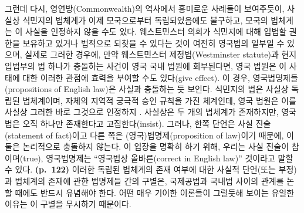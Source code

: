 그런데 다시, 영연방(Commonwealth)의 역사에서 흥미로운 사례들이
보여주듯이, 사실상 식민지의 법체계가 이제 모국으로부터 독립되었음에도
불구하고, 모국의 법체계는 이 사실을 인정하지 않을 수도 있다.
웨스트민스터 의회가 식민지에 대해 입법할 권한을 보유하고 있거나 법적으로
되찾을 수 있다는 것이 여전히 영국법의 일부일 수 있으며, 실제로 그러한
경우에, 만약 웨스트민스터 제정법(Westminster statute)과 현지 입법부의 법
하나가 충돌하는 사건이 영국 국내 법원에 회부된다면, 영국 법원은 이
사태에 대한 이러한 관점에 효력을 부여할 수도 있다(give effect). 이 경우,
영국법명제들(propositions of English law)은 사실과 충돌하는 듯 보인다.
식민지의 법은 사실상 독립된 법체계이며, 자체의 지역적 궁극적 승인 규칙을
가진 체계인데, 영국 법원은 이를 사실상 그러한 바로 그것으로 인정하지
. 사실상은 두 개의 법체계가 존재하지만, 영국법은 오직
하나만 존재한다고 고집한다(insist). 그러나, 한쪽 단언은 사실
진술(statement of fact)이고 다른 쪽은 (영국)법명제(proposition of
law)이기 때문에, 이 둘은 논리적으로 충돌하지 않는다. 이 입장을 명확히
하기 위해, 우리는 사실 진술이 참이며(true), 영국법명제는 “영국법상
올바른(correct in English law)” 것이라고 말할 수 있다.
\textbf{(p.~122)} 이러한 독립된 법체계의 존재 여부에 대한 사실적
단언(또는 부정)과 법체계의 존재에 관한 법명제들 간의 구별은, 국제공법과
국내법 사이의 관계를 논할 때에도 반드시 유념해야 한다. 어떤 매우 기이한
이론들이 그럴듯해 보이는 유일한 이유는 이 구별을 무시하기 때문이다.

